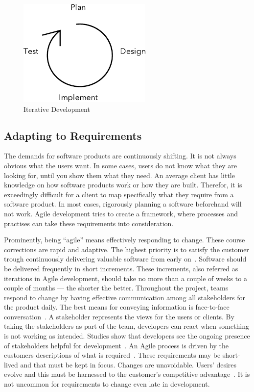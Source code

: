 \documentclass[english]{tktltiki2}
\begin{document}
\begin{figure}[h!]

    \vspace{1cm}
    \centering

    \includegraphics{iterative-development}

    \caption{Iterative Development}
    \label{figure:iterative-development}

\end{figure}

\subsection{Adapting to Requirements}

The demands for software products are continuously shifting. It is not always obvious what the users want. In some cases, users do not know what they are looking for, until you show them what they need. An average client has little knowledge on how software products work or how they are built. Therefor, it is exceedingly difficult for a client to map specifically what they require from a software product. In most cases, rigorously planning a software beforehand will not work. Agile development tries to create a framework, where processes and practises can take these requirements into consideration.

Prominently, being “agile” means effectively responding to change. These course corrections are rapid and adaptive. The highest priority is to satisfy the customer trough continuously delivering valuable software from early on~\cite{BBB01b}. Software should be delivered frequently in short increments. These increments, also referred as iterations in Agile development, should take no more than a couple of weeks to a couple of months — the shorter the better. Throughout the project, teams respond to change by having effective communication among all stakeholders for the product daily. The best means for conveying information is face-to-face conversation~\cite{BBB01b}. A stakeholder represents the views for the users or clients. By taking the stakeholders as part of the team, developers can react when something is not working as intended. Studies show that developers see the ongoing presence of stakeholders helpful for development~\cite{DD08}. An Agile process is driven by the customers descriptions of what is required~\cite{BBB01b}. These requirements may be short-lived and that must be kept in focus. Changes are unavoidable. Users’ desires evolve and this must be harnessed to the customer’s competitive advantage~\cite{BBB01b}. It is not uncommon for requirements to change even late in development.
\end{document}
